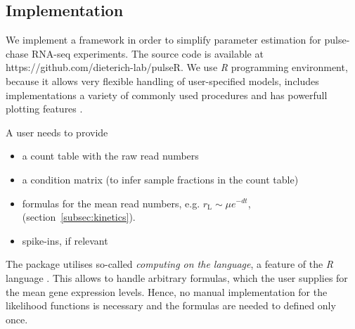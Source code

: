 \subsection{Implementation}
We implement a framework in order  to simplify parameter estimation for 
pulse-chase RNA-seq experiments. The source code is available 
at {https://github.com/dieterich-lab/pulseR}.
We use \emph{R} programming environment, 
because it allows very flexible handling of user-specified models, 
includes implementations a variety of commonly used procedures and 
has powerfull plotting features \citep{rlang}.
\par A user needs to provide
\begin{itemize}
 \item a count table with the raw read numbers
 \item a condition matrix (to infer sample fractions in the count table)
 \item formulas for the mean read numbers, e.g. 
 $r_\text{L}\sim \mu e^{-dt}$, (section~\ref{subsec:kinetics}).
 \item spike-ins, if relevant
\end{itemize}
The package utilises so-called \emph{computing on the language},
a feature of the \emph{R} language \citep{team2000r}.
This allows to handle arbitrary formulas, which the user supplies for 
the mean gene expression levels. Hence, no manual 
implementation for the likelihood functions is necessary and the 
formulas are needed to defined only once.
